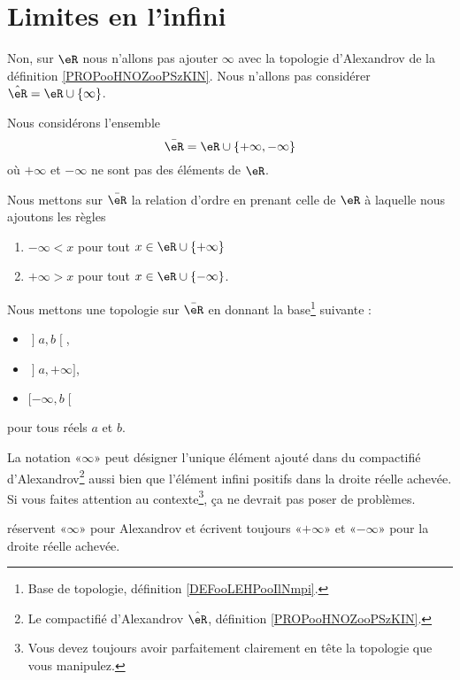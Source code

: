 \section{Limites en l'infini}

Non, sur \( \eR\) nous n'allons pas ajouter \( \infty\) avec la topologie d'Alexandrov de la définition \ref{PROPooHNOZooPSzKIN}. Nous n'allons pas considérer \( \hat \eR=\eR\cup\{ \infty \}\).

\begin{definition}        \label{DEFooRUyiBSUooALDDOa}
	Nous considérons l'ensemble
	\begin{equation}
		\bar \eR=\eR\cup\{ +\infty,-\infty \}
	\end{equation}
	où \( +\infty\) et \( -\infty\) ne sont pas des éléments de \( \eR\).

	Nous mettons sur \( \bar\eR\) la relation d'ordre en prenant celle de \( \eR\) à laquelle nous ajoutons les règles
	\begin{enumerate}
		\item
		      \( -\infty<x\) pour tout \( x\in\eR\cup\{ +\infty \}\)
		\item
		      \( +\infty>x\) pour tout \( x\in \eR\cup\{ -\infty \}\).
	\end{enumerate}

	Nous mettons une topologie sur \( \bar\eR\) en donnant la base\footnote{Base de topologie, définition \ref{DEFooLEHPooIlNmpi}.} suivante :
	\begin{itemize}
		\item \( \mathopen] a , b \mathclose[\),
		\item \( \mathopen] a , +\infty \mathclose]\),
		\item \( \mathopen[ -\infty , b \mathclose[\)
	\end{itemize}
	pour tous réels \( a\) et \( b\).
\end{definition}

\begin{normaltext}
	La notation «\( \infty\)» peut désigner l'unique élément ajouté dans du compactifié d'Alexandrov\footnote{Le compactifié d'Alexandrov \( \hat \eR\), définition \ref{PROPooHNOZooPSzKIN}.} aussi bien que l'élément infini positifs dans la droite réelle achevée. Si vous faites attention au contexte\footnote{Vous devez toujours avoir parfaitement clairement en tête la topologie que vous manipulez.}, ça ne devrait pas poser de problèmes.

	 réservent «\( \infty\)» pour Alexandrov et écrivent toujours «\( +\infty\)» et «\( -\infty\)» pour la droite réelle achevée.
\end{normaltext}

